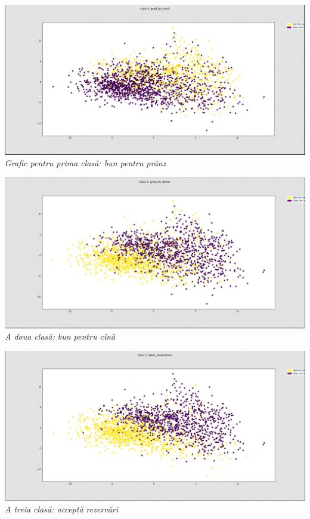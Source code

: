 \begin{center}
\includegraphics[scale=0.4]{class0} \\
\textit{Grafic pentru prima clasă: bun pentru prânz} \\
\hfill \break

\includegraphics[scale=0.4]{class1} \\
\textit{A doua clasă: bun pentru cină} \\
\hfill \break

\includegraphics[scale=0.4]{class2} \\ 
\textit{A treia clasă: acceptă rezervări} \\ 
\hfill \break


\end{center}
